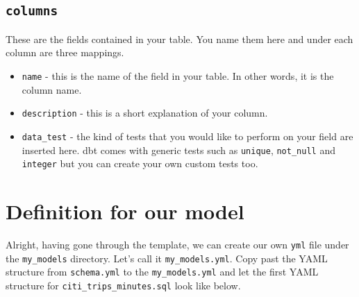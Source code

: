 \documentclass[
]{book}
\begin{document}
\hypertarget{columns}{%
\subsection{\texorpdfstring{\texttt{columns}}{columns}}\label{columns}}

These are the fields contained in your table. You name them here and under each column are three mappings.

\begin{itemize}
\item
  \texttt{name} - this is the name of the field in your table. In other words, it is the column name.
\item
  \texttt{description} - this is a short explanation of your column.
\item
  \texttt{data\_test} - the kind of tests that you would like to perform on your field are inserted here. dbt comes with generic tests such as \texttt{unique}, \texttt{not\_null} and \texttt{integer} but you can create your own custom tests too.
\end{itemize}

\hypertarget{definition-for-our-model}{%
\section{Definition for our model}\label{definition-for-our-model}}

Alright, having gone through the template, we can create our own \texttt{yml} file under the \texttt{my\_models} directory. Let's call it \texttt{my\_models.yml}. Copy past the YAML structure from \texttt{schema.yml} to the \texttt{my\_models.yml} and let the first YAML structure for \texttt{citi\_trips\_minutes.sql} look like below.
\end{document}
